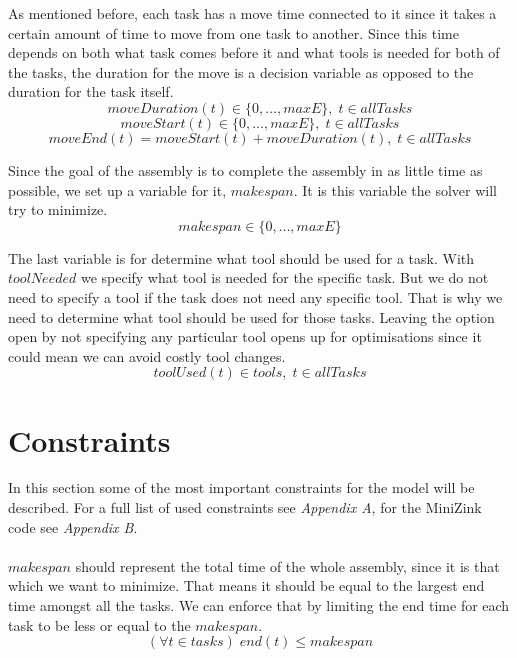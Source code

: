   \noindent As mentioned before, each task has a move time connected to it since it takes a certain amount of time to move from one task to another. Since this time depends on both what task comes before it and what tools is needed for both of the tasks, the duration for the move is a decision variable as opposed to the duration for the task itself.
 \begin{equation}\label{eq:49}
 moveDuration(t) \in \{0 , \ldots , maxE\}, \; t \in allTasks
 \end{equation}
 \begin{equation}\label{eq:50}
 moveStart(t) \in \{0 , \ldots , maxE\}, \; t \in allTasks
 \end{equation}
 \begin{equation}\label{eq:51}
 moveEnd(t) = moveStart(t) + moveDuration(t), \; t \in allTasks
 \end{equation}

  \noindent Since the goal of the assembly is to complete the assembly in as little time as possible, we set up a variable for it, $makespan$. It is this variable the solver will try to minimize.
 \begin{equation}\label{eq:48}
 makespan \in \{0 , \ldots , maxE\}
 \end{equation}

  \noindent The last variable is for determine what tool should be used for a task. With $toolNeeded$ we specify what tool is needed for the specific task. But we do not need to specify a tool if the task does not need any specific tool. That is why we need to determine what tool should be used for those tasks. Leaving the option open by not specifying any particular tool opens up for optimisations since it could mean we can avoid costly tool changes.
 \begin{equation}\label{eq:52}
 toolUsed(t) \in tools, \; t \in allTasks
 \end{equation}
  
 
 \section{Constraints}\label{seq:constraints}
 In this section some of the most important constraints for the model will be described. For a full list of used constraints see \emph{Appendix A}, for the MiniZink code see \emph{Appendix B}.
 \\\\
 $makespan$ should represent the total time of the whole assembly, since it is that which we want to minimize. That means it should be equal to the largest end time amongst all the tasks. We can enforce that by limiting the end time for each task to be less or equal to the $makespan$.
 \begin{equation}\label{eq:92}
 (\forall t \in tasks) \; end(t) \le makespan
 \end{equation}

